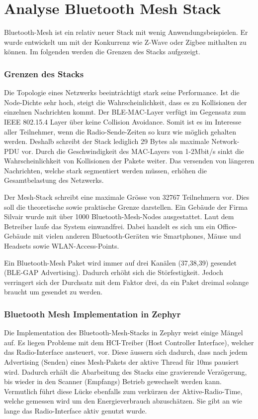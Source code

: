 \clearpage
\section{Analyse Bluetooth Mesh Stack}\label{sec:AnalyseBluetoothMeshStack}
Bluetooth-Mesh ist ein relativ neuer Stack mit wenig Anwendungsbeispielen. Er wurde entwickelt um mit der Konkurrenz wie Z-Wave oder Zigbee mithalten zu können. Im folgenden werden die Grenzen des Stacks aufgezeigt.


\subsubsection{Grenzen des Stacks}\label{subsec:BLEMeshProtokollStack}
Die Topologie eines Netzwerks beeinträchtigt stark seine Performance. Ist die Node-Dichte sehr hoch, steigt die Wahrscheinlichkeit, dass es zu Kollisionen der einzelnen Nachrichten kommt. Der BLE-MAC-Layer verfügt im Gegensatz zum IEEE 802.15.4 Layer über keine Collision Avoidance. Somit ist es im Interesse aller Teilnehmer, wenn die Radio-Sende-Zeiten so kurz wie möglich gehalten werden. Deshalb schreibt der Stack lediglich 29 Bytes als maximale Network-PDU vor. Durch die Geschwindigkeit des MAC-Layers von 1-2Mbit/s sinkt die Wahrscheinlichkeit von Kollisionen der Pakete weiter. Das versenden von längeren Nachrichten, welche stark segmentiert werden müssen, erhöhen die Gesamtbelastung des Netzwerks. \cite{bluetooth_sig_mesh_netzwerk_spezifikationen_2020}

Der Mesh-Stack schreibt eine maximale Grösse von 32767 Teilnehmern vor. Dies soll die theoretische sowie praktische Grenze darstellen. Ein Gebäude der Firma Silvair wurde mit über 1000 Bluetooth-Mesh-Nodes ausgestattet. Laut dem Betreiber laufe das System einwandfrei. Dabei handelt es sich um ein Office-Gebäude mit vielen anderen Bluetooth-Geräten wie Smartphones, Mäuse und Headsets sowie WLAN-Access-Points.  \cite{woolley_how_bluetooth_mesh_puts_the_large__2018}

Ein Bluetooth-Mesh Paket wird immer auf drei Kanälen (37,38,39) gesendet (BLE-GAP Advertising). Dadurch erhöht sich die Störfestigkeit. Jedoch verringert sich der Durchsatz mit dem Faktor drei, da ein Paket dreimal solange braucht um gesendet zu werden. 

\subsubsection{Bluetooth Mesh Implementation in Zephyr}\label{subsec:BLEMeshProtokollStackZephyr}
Die Implementation des Bluetooth-Mesh-Stacks in Zephyr weist einige Mängel auf. Es liegen Probleme mit dem HCI-Treiber (Host Controller Interface), welcher das Radio-Interface ansteuert, vor. Diese äussern sich dadurch, dass nach jedem Advertising (Senden) eines Mesh-Pakets  der aktive Thread für 10ms pausiert wird. Dadurch erhält die Abarbeitung des Stacks eine gravierende Verzögerung, bis wieder in den Scanner (Empfangs) Betrieb gewechselt werden kann. Vermutlich führt diese Lücke ebenfalls zum verkürzen der Aktive-Radio-Time, welche gemessen wird um den Energieverbrauch abzuschätzen. Sie gibt an wie lange das Radio-Interface aktiv genutzt wurde. 

